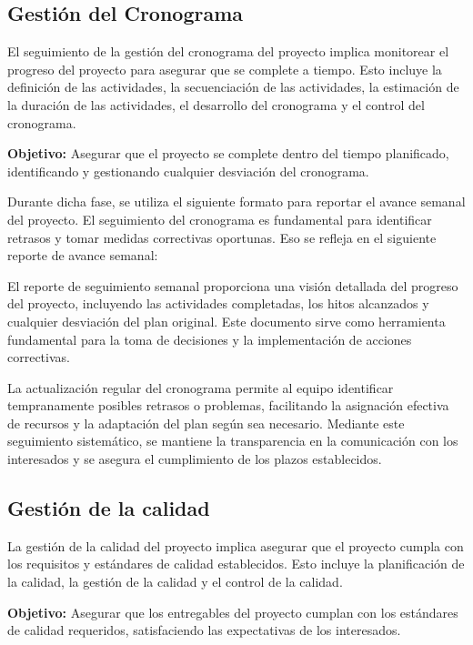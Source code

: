 

\subsection{Gestión del Cronograma}

    El seguimiento de la gestión del cronograma del proyecto implica monitorear el progreso del proyecto para asegurar que se complete a tiempo. Esto incluye la definición de las actividades, la secuenciación de las actividades, la estimación de la duración de las actividades, el desarrollo del cronograma y el control del cronograma.


    \textbf{Objetivo:} Asegurar que el proyecto se complete dentro del tiempo planificado, identificando y gestionando cualquier desviación del cronograma.

    Durante dicha fase, se utiliza el siguiente formato para reportar el avance semanal del proyecto. El seguimiento del cronograma es fundamental para identificar retrasos y tomar medidas correctivas oportunas. Eso se refleja en el siguiente reporte de avance semanal:

  El reporte de seguimiento semanal proporciona una visión detallada del progreso del proyecto, incluyendo las actividades completadas, los hitos alcanzados y cualquier desviación del plan original. Este documento sirve como herramienta fundamental para la toma de decisiones y la implementación de acciones correctivas.

  La actualización regular del cronograma permite al equipo identificar tempranamente posibles retrasos o problemas, facilitando la asignación efectiva de recursos y la adaptación del plan según sea necesario. Mediante este seguimiento sistemático, se mantiene la transparencia en la comunicación con los interesados y se asegura el cumplimiento de los plazos establecidos.

\subsection{Gestión de la calidad}

    La gestión de la calidad del proyecto implica asegurar que el proyecto cumpla con los requisitos y estándares de calidad establecidos. Esto incluye la planificación de la calidad, la gestión de la calidad y el control de la calidad.

    \textbf{Objetivo:} Asegurar que los entregables del proyecto cumplan con los estándares de calidad requeridos, satisfaciendo las expectativas de los interesados.

